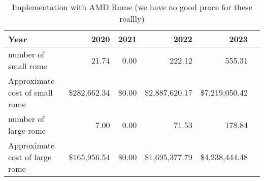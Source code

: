 \tiny \begin{longtable} { |p{}  |r  |r  |r  |r  |r |} 
\caption{Implementation with AMD Rome (we have no good proce for these reallly) \label{tab:Rome}}\\ 
\hline 
\textbf{Year}&\textbf{2020}&\textbf{2021}&\textbf{2022}&\textbf{2023} \\ \hline
{number of small rome }&{21.74}&{0.00}&{222.12}&{555.31} \\ \hline
{Approximate cost of small rome }&{\$282,662.34}&{\$0.00}&{\$2,887,620.17}&{\$7,219,050.42} \\ \hline
{number of large rome }&{7.00}&{0.00}&{71.53}&{178.84} \\ \hline
{Approximate cost of large rome }&{\$165,956.54}&{\$0.00}&{\$1,695,377.79}&{\$4,238,444.48} \\ \hline
\end{longtable} \normalsize
